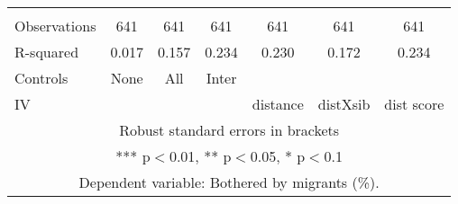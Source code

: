 \begin{tabular}{lcccccc}
 &  &  &  &  &  &  \\
Observations & 641 & 641 & 641 & 641 & 641 & 641 \\
R-squared & 0.017 & 0.157 & 0.234 & 0.230 & 0.172 & 0.234 \\
Controls & None & All & Inter &  &  &  \\
 IV &  &  &  & distance & distXsib & dist score \\ \hline
\multicolumn{7}{c}{ Robust standard errors in brackets} \\
\multicolumn{7}{c}{ *** p$<$0.01, ** p$<$0.05, * p$<$0.1} \\
\multicolumn{7}{c}{ Dependent variable: Bothered by migrants (\%).} \\
\end{tabular}
